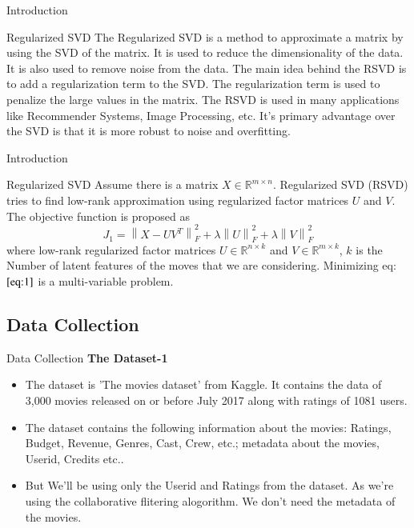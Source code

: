 \documentclass{beamer}
\newcommand\norm[1]{\left\lVert#1\right\rVert}
\begin{document}
 \begin{frame}{Introduction}
    \begin{block}{Regularized SVD}
    The Regularized SVD is a method to approximate a matrix by using the SVD of the matrix. It is used to reduce the dimensionality of the data. It is also used to remove noise from the data.
    The main idea behind the RSVD is to add a regularization term to the SVD. The regularization term is used to penalize the large values in the matrix.
    The RSVD is used in many applications like Recommender Systems, Image Processing, etc.
    It's primary advantage over the SVD is that it is more robust to noise and overfitting.
    \end{block} 
 \end{frame}

 \begin{frame}{Introduction}
    \begin{block}{Regularized SVD}
    Assume there is a matrix $X \in \mathbb{R}^{m \times n}$. Regularized SVD (RSVD) tries to find low-rank approximation using regularized factor matrices $U$ and $V$. The objective function is proposed as
    \begin{equation}
        J_1 = \norm{X - UV^T}_F^2 + \lambda\norm{U}_F^2 + \lambda\norm{V}_F^2 \label{eq:1}
    \end{equation}
    where low-rank regularized factor matrices $U \in \mathbb{R}^{n \times k}$ and $V \in \mathbb{R}^{m \times k}$, $k$ is the Number of latent features of the moves that we are considering. Minimizing eq:$\ref{eq:1}$ is a multi-variable problem.
    \end{block}
 \end{frame}

\begin{frame}
\section{Data Collection}
\end{frame}
\begin{frame}{Data Collection}
   \textbf{The Dataset-1}
     \begin{itemize}
    \item The dataset is 'The movies dataset' from Kaggle. It contains the data of 3,000 movies released on or before July 2017 along with ratings of 1081 users.
    \item The dataset contains the following information about the movies: Ratings, Budget, Revenue, Genres, Cast, Crew, etc.; metadata about the movies, Userid, Credits etc..
    \item But We'll be using only the Userid and Ratings from the dataset. As we're using the collaborative flitering alogorithm. We don't need the metadata of the movies.
\end{itemize}
\end{frame}
\end{document}
